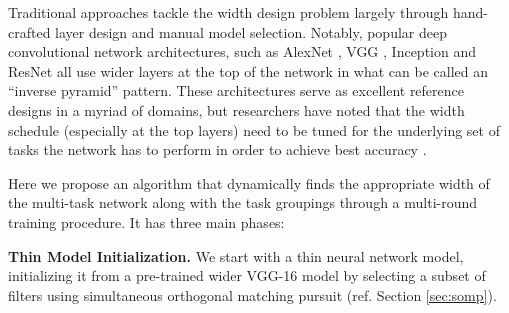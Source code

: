\documentclass[10pt,twocolumn,letterpaper]{article}
\begin{document}
Traditional approaches tackle the width design problem largely through hand-crafted layer design and manual model selection. Notably, popular deep convolutional network architectures, such as AlexNet \cite{krizhevsky2012imagenet}, VGG \cite{simonyan2014very}, Inception \cite{szegedy2015going} and ResNet \cite{he2015deep}
all use wider layers at the top of the network in what can be called an ``inverse pyramid'' pattern. These architectures serve as excellent reference designs in a myriad of domains, but researchers have noted that the width schedule (especially at the top layers) need to be tuned for the underlying set of tasks the network has to perform in order to achieve best accuracy \cite{Misra16}.

Here we propose an algorithm that dynamically finds the appropriate width of the multi-task network along with the task groupings through a multi-round training procedure. It has three main phases:

{\bf Thin Model Initialization.}
We start with a thin neural network model, initializing it from a pre-trained wider VGG-16 model by selecting a subset of filters using simultaneous orthogonal matching pursuit (ref. Section \ref{sec:somp}).   
\end{document}
